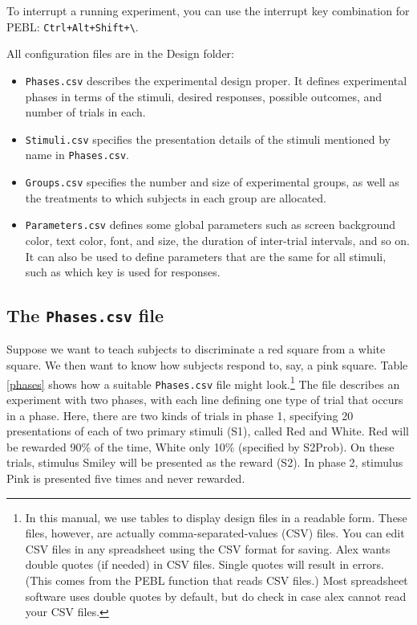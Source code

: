 \documentclass[11pt,]{article}
\begin{document}
To interrupt a running experiment, you can use the interrupt key
combination for PEBL: \texttt{Ctrl+Alt+Shift+\textbackslash{}}.


All configuration files are in the Design folder:

\begin{itemize}
\item
  \texttt{Phases.csv} describes the experimental design proper. It
  defines experimental phases in terms of the stimuli, desired
  responses, possible outcomes, and number of trials in each.
\item
  \texttt{Stimuli.csv} specifies the presentation details of the stimuli
  mentioned by name in \texttt{Phases.csv}.
\item
  \texttt{Groups.csv} specifies the number and size of experimental
  groups, as well as the treatments to which subjects in each group are
  allocated.
\item
  \texttt{Parameters.csv} defines some global parameters such as screen
  background color, text color, font, and size, the duration of
  inter-trial intervals, and so on. It can also be used to define
  parameters that are the same for all stimuli, such as which key is
  used for responses.
\end{itemize}

\subsection{The \texttt{Phases.csv} file}\label{the-phases.csv-file}

Suppose we want to teach subjects to discriminate a red square from a
white square. We then want to know how subjects respond to, say, a pink
square. Table \ref{phases} shows how a suitable \texttt{Phases.csv} file
might look.\footnote{In this manual, we use tables to display design
  files in a readable form. These files, however, are actually
  comma-separated-values (CSV) files. You can edit CSV files in any
  spreadsheet using the CSV format for saving. Alex wants double quotes
  (if needed) in CSV files. Single quotes will result in errors. (This
  comes from the PEBL function that reads CSV files.) Most spreadsheet
  software uses double quotes by default, but do check in case alex
  cannot read your CSV files.} The file describes an experiment with two
phases, with each line defining one type of trial that occurs in a
phase. Here, there are two kinds of trials in phase 1, specifying 20
presentations of each of two primary stimuli (S1), called Red and White.
Red will be rewarded 90\% of the time, White only 10\% (specified by
S2Prob). On these trials, stimulus Smiley will be presented as the
reward (S2). In phase 2, stimulus Pink is presented five times and never
rewarded.
\end{document}
